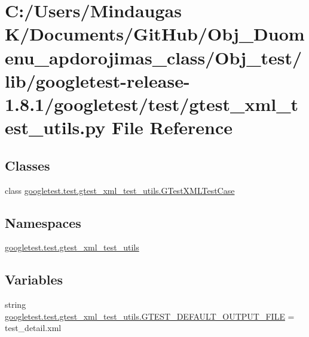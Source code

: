 \hypertarget{_obj__test_2lib_2googletest-release-1_88_81_2googletest_2test_2gtest__xml__test__utils_8py}{}\section{C\+:/\+Users/\+Mindaugas K/\+Documents/\+Git\+Hub/\+Obj\+\_\+\+Duomenu\+\_\+apdorojimas\+\_\+class/\+Obj\+\_\+test/lib/googletest-\/release-\/1.8.1/googletest/test/gtest\+\_\+xml\+\_\+test\+\_\+utils.py File Reference}
\label{_obj__test_2lib_2googletest-release-1_88_81_2googletest_2test_2gtest__xml__test__utils_8py}
\subsection*{Classes}
\begin{DoxyCompactItemize}
\item 
class \mbox{\hyperlink{classgoogletest_1_1test_1_1gtest__xml__test__utils_1_1_g_test_x_m_l_test_case}{googletest.\+test.\+gtest\+\_\+xml\+\_\+test\+\_\+utils.\+G\+Test\+X\+M\+L\+Test\+Case}}
\end{DoxyCompactItemize}
\subsection*{Namespaces}
\begin{DoxyCompactItemize}
\item 
 \mbox{\hyperlink{namespacegoogletest_1_1test_1_1gtest__xml__test__utils}{googletest.\+test.\+gtest\+\_\+xml\+\_\+test\+\_\+utils}}
\end{DoxyCompactItemize}
\subsection*{Variables}
\begin{DoxyCompactItemize}
\item 
string \mbox{\hyperlink{namespacegoogletest_1_1test_1_1gtest__xml__test__utils_a5a1d55a3a699ce8c8e20e2abb26af163}{googletest.\+test.\+gtest\+\_\+xml\+\_\+test\+\_\+utils.\+G\+T\+E\+S\+T\+\_\+\+D\+E\+F\+A\+U\+L\+T\+\_\+\+O\+U\+T\+P\+U\+T\+\_\+\+F\+I\+LE}} = \textquotesingle{}test\+\_\+detail.\+xml\textquotesingle{}
\end{DoxyCompactItemize}
